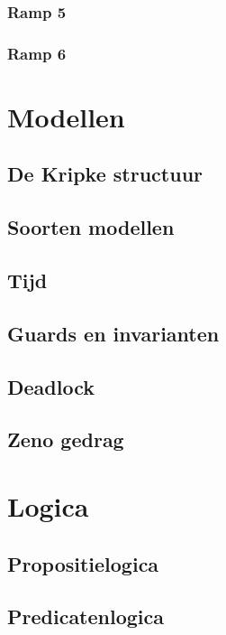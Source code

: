 \documentclass{article}
\begin{document}
\subsubsection{Ramp 5}
\subsubsection{Ramp 6}

\section{Modellen}

\subsection{De Kripke structuur}

\subsection{Soorten modellen}

\subsection{Tijd}

\subsection{Guards en invarianten}

\subsection{Deadlock}

\subsection{Zeno gedrag}

\section{Logica}

\subsection{Propositielogica}

\subsection{Predicatenlogica}
\end{document}
